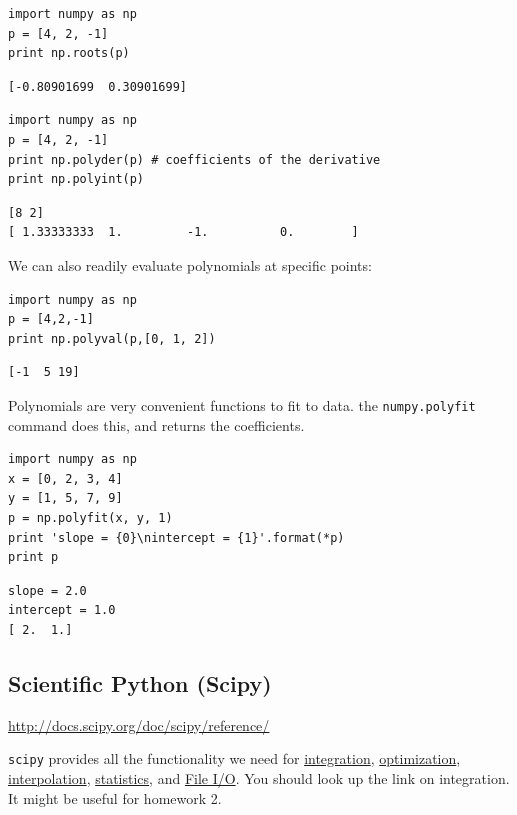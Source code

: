 \documentclass[11pt]{article}
\begin{document}
\begin{verbatim}
import numpy as np
p = [4, 2, -1]
print np.roots(p)
\end{verbatim}

\begin{verbatim}
[-0.80901699  0.30901699]
\end{verbatim}

\begin{verbatim}
import numpy as np
p = [4, 2, -1]
print np.polyder(p) # coefficients of the derivative
print np.polyint(p)
\end{verbatim}

\begin{verbatim}
[8 2]
[ 1.33333333  1.         -1.          0.        ]
\end{verbatim}

We can also readily evaluate polynomials at specific points:
\begin{verbatim}
import numpy as np
p = [4,2,-1]
print np.polyval(p,[0, 1, 2])
\end{verbatim}

\begin{verbatim}
[-1  5 19]
\end{verbatim}

Polynomials are very convenient functions to fit to data. the \texttt{numpy.polyfit} command does this, and returns the coefficients.

\begin{verbatim}
import numpy as np
x = [0, 2, 3, 4]
y = [1, 5, 7, 9]
p = np.polyfit(x, y, 1)
print 'slope = {0}\nintercept = {1}'.format(*p)
print p
\end{verbatim}

\begin{verbatim}
slope = 2.0
intercept = 1.0
[ 2.  1.]
\end{verbatim}


\subsection{Scientific Python (Scipy)}
\label{sec-3-10}
\url{http://docs.scipy.org/doc/scipy/reference/}

\texttt{scipy} provides all the functionality we need for \href{http://docs.scipy.org/doc/scipy/reference/tutorial/integrate.html}{integration}, \href{http://docs.scipy.org/doc/scipy/reference/tutorial/optimize.html}{optimization}, \href{http://docs.scipy.org/doc/scipy/reference/tutorial/interpolate.html}{interpolation}, \href{http://docs.scipy.org/doc/scipy/reference/tutorial/stats.html}{statistics}, and \href{http://docs.scipy.org/doc/scipy/reference/tutorial/io.html}{File I/O}. You should look up the link on integration. It might be useful for homework 2.
\end{document}
